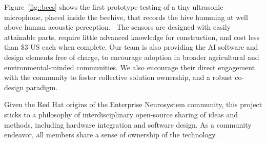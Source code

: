 Figure~\ref{fig::bees} shows the first prototype testing of a tiny ultrasonic microphone, placed inside the beehive, that records the hive humming at well above human acoustic perception.  
The sensors are designed with easily attainable parts, require little advanced knowledge for construction, and cost less than \$3 US each when complete. 
Our team is also providing the AI software and design elements free of charge, to encourage adoption in broader agricultural and environmental-minded communities. 
We also encourage their direct engagement with the community to foster collective solution ownership, and a robust co-design paradigm.

Given the Red Hat origins of the Enterprise Neurosystem community, this project sticks to a philosophy of interdisciplinary open-source sharing of ideas and methods, including hardware integration and software design. 
As a community endeavor, all members share a sense of ownership of the technology.

